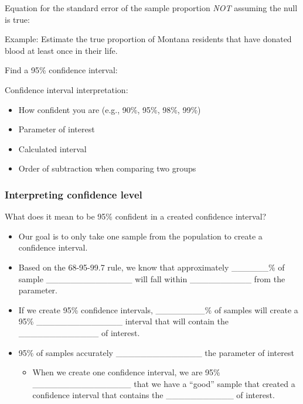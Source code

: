 \documentclass[
]{report}
\providecommand{\tightlist}{%
  \setlength{\itemsep}{0pt}\setlength{\parskip}{0pt}}
\begin{document}

Equation for the standard error of the sample proportion \emph{NOT} assuming the null is true:

\vspace{0.5in}

\newpage

Example: Estimate the true proportion of Montana residents that have donated blood at least once in their life.

Find a 95\% confidence interval:

\vspace{1in}

Confidence interval interpretation:

\begin{itemize}
\item
  How confident you are (e.g., 90\%, 95\%, 98\%, 99\%)
\item
  Parameter of interest
\item
  Calculated interval
\item
  Order of subtraction when comparing two groups
\end{itemize}

\vspace{0.8in}

\subsubsection*{Interpreting confidence level}\label{interpreting-confidence-level}


What does it mean to be 95\% confident in a created confidence interval?

\begin{itemize}
\item
  Our goal is to only take one sample from the population to create a confidence interval.
\item
  Based on the 68-95-99.7 rule, we know that approximately \_\_\_\_\_\_\% of sample \_\_\_\_\_\_\_\_\_\_\_\_\_\_ will fall within \_\_\_\_\_\_\_\_\_\_ from the parameter.
\item
  If we create 95\% confidence intervals, \_\_\_\_\_\_\_\_\% of samples will create a 95\% \_\_\_\_\_\_\_\_\_\_\_\_\_\_ interval that will contain the \_\_\_\_\_\_\_\_\_\_\_\_\_ of interest.
\item
  95\% of samples accurately \_\_\_\_\_\_\_\_\_\_\_\_\_\_ the parameter of interest

  \begin{itemize}
  \tightlist
  \item
    When we create one confidence interval, we are 95\% \_\_\_\_\_\_\_\_\_\_\_\_\_\_\_\_ that we have a ``good'' sample that created a confidence interval that contains the \_\_\_\_\_\_\_\_\_\_\_ of interest.
  \end{itemize}
\end{itemize}
\end{document}
